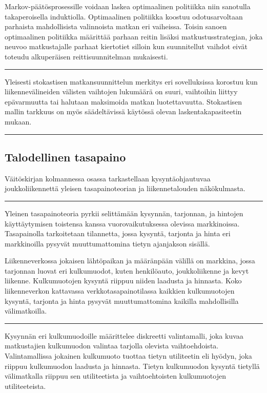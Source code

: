\documentclass[a4paper,12pt]{article}
\newcommand*\sepline{%
  \begin{center}
    \rule[1ex]{.5\textwidth}{.5pt}
  \end{center}}
\begin{document}
Markov-päätösprosessille voidaan laskea optimaalinen politiikka niin sanotulla takaperoisella induktiolla. Optimaalinen politiikka
koostuu odotusarvoltaan parhaista mahdollisista valinnoista matkan eri vaiheissa. Toisin sanoen optimaalinen politiikka 
määrittää parhaan reitin lisäksi matkustusstrategian, joka neuvoo matkustajalle parhaat kiertotiet silloin kun 
suunnitellut vaihdot eivät toteudu alkuperäisen reittisuunnitelman mukaisesti.

\sepline

Yleisesti stokastisen matkansuunnittelun merkitys eri sovelluksissa korostuu kun liikennevälineiden välisten vaihtojen lukumäärä on suuri, 
vaihtoihin liittyy epävarmuutta tai halutaan maksimoida matkan luotettavuutta. Stokastisen mallin tarkkuus on myös säädeltävissä
käytössä olevan laskentakapasiteetin mukaan.

\sepline


\subsection*{Talodellinen tasapaino}
Väitöskirjan kolmannessa osassa tarkastellaan kysyntäohjautuvaa joukkoliikennettä yleisen tasapainoteorian ja liikennetalouden näkökulmasta.

\sepline

Yleinen tasapainoteoria pyrkii selittämään kysynnän, tarjonnan, ja hintojen käyttäytymisen toistensa kanssa vuorovaikutuksessa
olevissa markkinoissa. Tasapainolla tarkoitetaan tilannetta, jossa kysyntä, tarjonta ja hinta eri markkinoilla pysyvät muuttumattomina
tietyn ajanjakson sisällä.

Liikenneverkossa jokaisen lähtöpaikan ja määränpään välillä on markkina, jossa tarjonnan luovat eri kulkumuodot, 
kuten henkilöauto, joukkoliikenne ja kevyt liikenne.
Kulkumuotojen kysyntä riippuu niiden laadusta ja hinnasta. Koko liikenneverkon kattavassa verkkotasapainotilassa kaikkien kulkumuotojen
kysyntä, tarjonta ja hinta pysyvät muuttumattomina kaikilla mahdollisilla välimatkoilla. 

\sepline

Kysynnän eri kulkumuodoille määrittelee diskreetti valintamalli, joka kuvaa matkustajien kulkumuodon valintaa tarjolla olevista vaihtoehdoista.
Valintamallissa jokainen kulkumuoto tuottaa tietyn utiliteetin eli hyödyn, joka riippuu kulkumuodon laadusta ja hinnasta. 
Tietyn kulkumuodon kysyntä tietyllä välimatkalla riippuu sen utiliteetista ja vaihtoehtoisten kulkumuotojen utiliteeteista.
\end{document}
